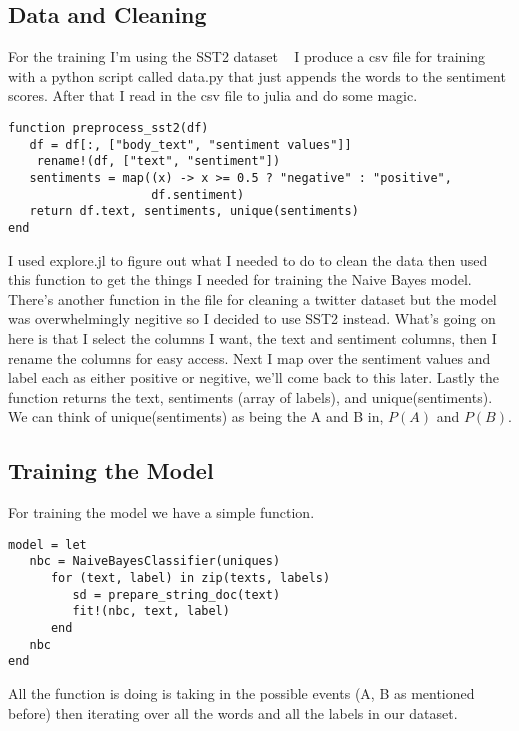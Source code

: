 \documentclass[12pt]{article}
\begin{document}
\subsection{Data and Cleaning}
For the training I'm using the SST2 dataset ~\cite{} %
I produce a csv file for training with a python script called data.py that just appends the words to the sentiment scores.
After that I read in the csv file to julia and do some magic.
\begin{verbatim}
function preprocess_sst2(df)
   df = df[:, ["body_text", "sentiment values"]]
	rename!(df, ["text", "sentiment"])
   sentiments = map((x) -> x >= 0.5 ? "negative" : "positive",
                    df.sentiment)
   return df.text, sentiments, unique(sentiments)
end
\end{verbatim}
I used explore.jl to figure out what I needed to do to clean the data then used this function to get the things I needed for training
the Naive Bayes model. There's another function in the file for cleaning a twitter dataset but the model was overwhelmingly negitive
so I decided to use SST2 instead. What's going on here is that I select the columns I want, the text and sentiment columns, then I
rename the columns for easy access. Next I map over the sentiment values and label each as either positive or negitive, we'll come
back to this later. Lastly the function returns the text, sentiments (array of labels), and unique(sentiments). We can think of
unique(sentiments) as being the A and B in, $P(A)$ and $P(B)$.

\subsection{Training the Model}
For training the model we have a simple function.
\begin{verbatim}
model = let
   nbc = NaiveBayesClassifier(uniques)
      for (text, label) in zip(texts, labels)
         sd = prepare_string_doc(text)
         fit!(nbc, text, label)
      end
   nbc
end
\end{verbatim}
All the function is doing is taking in the possible events (A, B as mentioned before) then iterating over all the words and
all the labels in our dataset.
\end{document}
